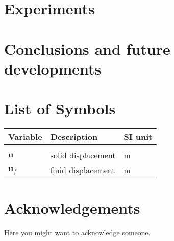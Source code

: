 \documentclass{Configuration_Files/PoliMi3i_thesis}
\begin{document}
\chapter{Experiments}\label{ch:experiments}


\chapter{Conclusions and future developments}\label{ch:conclusions}





\cleardoublepage
{} %



\listoffigures

\listoftables

\chapter*{List of Symbols} %
\begin{table}[H]
    \centering
    \begin{tabular}{lll}
        \textbf{Variable} & \textbf{Description} & \textbf{SI unit} \\
		\midrule \\[-9px]
        $\bm{u}$ & solid displacement & m \\[2px]
        $\bm{u}_f$ & fluid displacement & m \\[2px]
    \end{tabular}
\end{table}

\chapter*{Acknowledgements}
Here you might want to acknowledge someone.

\cleardoublepage
\end{document}
